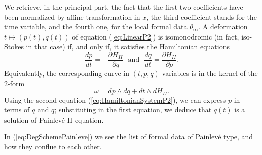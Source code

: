 \documentclass[12]{amsart}
\begin{document}
We retrieve, in the principal part, the fact that the first two coefficients have been normalized by affine transformation in $x$, 
the third coefficient stands for the time variable, and the fourth one, for the local formal data $\theta_\infty$.
A deformation $t\mapsto(p(t),q(t))$ of equation (\ref{eq:LinearP2})
is isomonodromic
(in fact, iso-Stokes in that case) if, and only if, it satisfies the Hamiltonian equations
\begin{equation}\label{eq:HamiltonianSystemP2}
\frac{dp}{dt}=-\frac{\partial H_{II}}{\partial q}\ \ \ \text{and}\ \ \ \frac{dq}{dt}=\frac{\partial H_{II}}{\partial p}.
\end{equation}
Equivalently, the corresponding curve in $(t,p,q)$-variables is in the kernel of the $2$-form 
\begin{equation}\label{eq:PoissonP2}
\omega=dp\wedge dq+dt\wedge dH_{II}.
\end{equation}
Using the second equation (\ref{eq:HamiltonianSystemP2}), we can express $p$ in terms of $q$ and $\dot{q}$;
substituting in the first equation, we deduce that $q(t)$ is a solution of Painlev\'e II equation.





In (\ref{eq:DegSchemePainleve}) we see the list of formal data of Painlev\'e type, and how they conflue to each other. 
\end{document}
